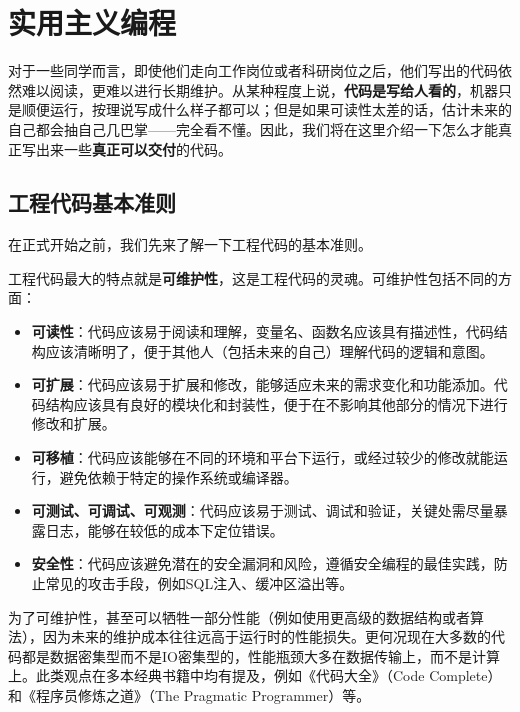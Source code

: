 \chapter{实用主义编程}\label{chap:pragmatic-coding}

对于一些同学而言，即使他们走向工作岗位或者科研岗位之后，他们写出的代码依然难以阅读，更难以进行长期维护。从某种程度上说，\textbf{代码是写给人看的}，机器只是顺便运行，按理说写成什么样子都可以；但是如果可读性太差的话，估计未来的自己都会抽自己几巴掌——完全看不懂。因此，我们将在这里介绍一下怎么才能真正写出来一些\textbf{真正可以交付}的代码。

\section{工程代码基本准则}

在正式开始之前，我们先来了解一下工程代码的基本准则。

工程代码最大的特点就是\textbf{可维护性}，这是工程代码的灵魂。可维护性包括不同的方面：
\begin{itemize}
  \item \textbf{可读性}：代码应该易于阅读和理解，变量名、函数名应该具有描述性，代码结构应该清晰明了，便于其他人（包括未来的自己）理解代码的逻辑和意图。
  \item \textbf{可扩展}：代码应该易于扩展和修改，能够适应未来的需求变化和功能添加。代码结构应该具有良好的模块化和封装性，便于在不影响其他部分的情况下进行修改和扩展。
  \item \textbf{可移植}：代码应该能够在不同的环境和平台下运行，或经过较少的修改就能运行，避免依赖于特定的操作系统或编译器。
  \item \textbf{可测试、可调试、可观测}：代码应该易于测试、调试和验证，关键处需尽量暴露日志，能够在较低的成本下定位错误。
  \item \textbf{安全性}：代码应该避免潜在的安全漏洞和风险，遵循安全编程的最佳实践，防止常见的攻击手段，例如SQL注入、缓冲区溢出等。
\end{itemize}
为了可维护性，甚至可以牺牲一部分性能（例如使用更高级的数据结构或者算法），因为未来的维护成本往往远高于运行时的性能损失。更何况现在大多数的代码都是数据密集型而不是IO密集型的，性能瓶颈大多在数据传输上，而不是计算上。此类观点在多本经典书籍中均有提及，例如《代码大全》（Code Complete）和《程序员修炼之道》（The Pragmatic Programmer）等。

